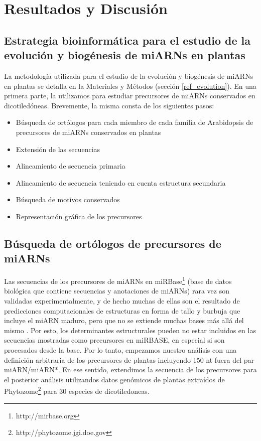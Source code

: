 \section{Resultados y Discusión}

\subsection{Estrategia bioinformática para el estudio de la evolución y biogénesis de miARNs en plantas}

La metodología utilizada para el estudio de la evolución y biogénesis de miARNs en plantas se detalla en la Materiales y Métodos (sección \ref{ref_evolution}).
En una primera parte, la utilizamos para estudiar precursores de miARNs conservados en dicotiledóneas. 
Brevemente, la misma consta de los siguientes pasos:

\begin{itemize}
    \item Búsqueda de ortólogos para cada miembro de cada familia de Arabidopsis de  precursores de miARNs conservados en plantas
    \item Extensión de las secuencias
    \item Alineamiento de secuencia primaria
    \item Alineamiento de secuencia teniendo en cuenta estructura secundaria
    \item Búsqueda de motivos conservados
    \item Representación gráfica de los precursores
\end{itemize}

\subsection{Búsqueda de ortólogos de precursores de miARNs}

Las secuencias de los precursores de miARNs en miRBase\footnote{http://mirbase.org} (base de datos biológica que contiene secuencias y anotaciones de miARNs) rara vez son validadas experimentalmente, y de hecho muchas de ellas son el resultado de predicciones computacionales de estructuras en forma de tallo y burbuja que incluye el miARN maduro, pero que no se extiende muchas bases más allá del mismo \cite{Kozomara2014}.
Por esto, los determinantes estructurales pueden no estar incluidos en las secuencias mostradas como precursores en miRBASE, en especial si son procesados desde la base.
Por lo tanto, empezamos nuestro análisis con una definición arbitraria de los precursores de plantas incluyendo 150 nt fuera del par miARN/miARN*.
En ese sentido, extendimos la secuencia de los precursores para el posterior análisis utilizandos datos genómicos de plantas extraídos de Phytozome\footnote{http://phytozome.jgi.doe.gov} para 30 especies de dicotiledoneas.

